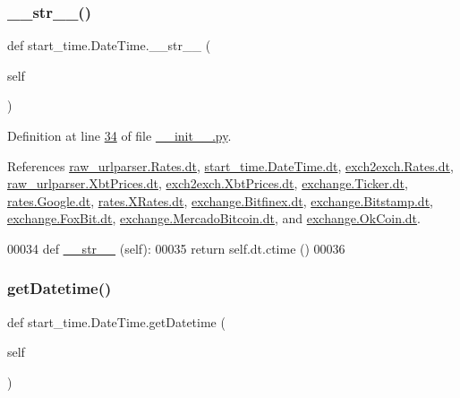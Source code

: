 \subsubsection{\texorpdfstring{\+\_\+\+\_\+str\+\_\+\+\_\+()}{\_\_str\_\_()}}
{\footnotesize\ttfamily def start\+\_\+time.\+Date\+Time.\+\_\+\+\_\+str\+\_\+\+\_\+ (\begin{DoxyParamCaption}\item[{}]{self }\end{DoxyParamCaption})}



Definition at line \hyperlink{start__time_2____init_____8py_source_l00034}{34} of file \hyperlink{start__time_2____init_____8py_source}{\+\_\+\+\_\+init\+\_\+\+\_\+.\+py}.



References \hyperlink{raw__urlparser_8py_source_l00024}{raw\+\_\+urlparser.\+Rates.\+dt}, \hyperlink{start__time_2____init_____8py_source_l00024}{start\+\_\+time.\+Date\+Time.\+dt}, \hyperlink{exch2exch_8py_source_l00028}{exch2exch.\+Rates.\+dt}, \hyperlink{raw__urlparser_8py_source_l00053}{raw\+\_\+urlparser.\+Xbt\+Prices.\+dt}, \hyperlink{exch2exch_8py_source_l00057}{exch2exch.\+Xbt\+Prices.\+dt}, \hyperlink{exchange_8py_source_l00059}{exchange.\+Ticker.\+dt}, \hyperlink{rates_8py_source_l00089}{rates.\+Google.\+dt}, \hyperlink{rates_8py_source_l00145}{rates.\+X\+Rates.\+dt}, \hyperlink{exchange_8py_source_l00437}{exchange.\+Bitfinex.\+dt}, \hyperlink{exchange_8py_source_l00509}{exchange.\+Bitstamp.\+dt}, \hyperlink{exchange_8py_source_l00573}{exchange.\+Fox\+Bit.\+dt}, \hyperlink{exchange_8py_source_l00649}{exchange.\+Mercado\+Bitcoin.\+dt}, and \hyperlink{exchange_8py_source_l00714}{exchange.\+Ok\+Coin.\+dt}.


\begin{DoxyCode}
00034     \textcolor{keyword}{def }\hyperlink{namespacerates_a2f1a70c33ee9e255938e4c19fd207264}{\_\_str\_\_} (self):
00035         \textcolor{keywordflow}{return} self.dt.ctime ()
00036 
\end{DoxyCode}
\mbox{\label{classstart__time_1_1_date_time_af7ca3b38639f6c06b75264ebf6e8884e}} 
\subsubsection{\texorpdfstring{get\+Datetime()}{getDatetime()}}
{\footnotesize\ttfamily def start\+\_\+time.\+Date\+Time.\+get\+Datetime (\begin{DoxyParamCaption}\item[{}]{self }\end{DoxyParamCaption})}



